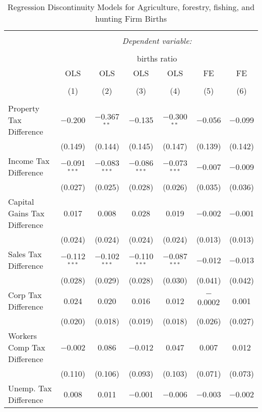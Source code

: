 
\begin{table}[!htbp] \centering 
  \caption{Regression Discontinuity Models for  Agriculture, forestry, fishing, and hunting Firm Births} 
  \label{11rd} 
\footnotesize 
\begin{tabular}{@{\extracolsep{5pt}}lcccccc} 
\\[-1.8ex]\hline 
\hline \\[-1.8ex] 
 & \multicolumn{6}{c}{\textit{Dependent variable:}} \\ 
\cline{2-7} 
\\[-1.8ex] & \multicolumn{6}{c}{births ratio} \\ 
 & OLS & OLS & OLS & OLS & FE & FE \\ 
\\[-1.8ex] & (1) & (2) & (3) & (4) & (5) & (6)\\ 
\hline \\[-1.8ex] 
 Property Tax Difference & $-$0.200 & $-$0.367$^{**}$ & $-$0.135 & $-$0.300$^{**}$ & $-$0.056 & $-$0.099 \\ 
  & (0.149) & (0.144) & (0.145) & (0.147) & (0.139) & (0.142) \\ 
  Income Tax Difference & $-$0.091$^{***}$ & $-$0.083$^{***}$ & $-$0.086$^{***}$ & $-$0.073$^{***}$ & $-$0.007 & $-$0.009 \\ 
  & (0.027) & (0.025) & (0.028) & (0.026) & (0.035) & (0.036) \\ 
  Capital Gains Tax Difference & 0.017 & 0.008 & 0.028 & 0.019 & $-$0.002 & $-$0.001 \\ 
  & (0.024) & (0.024) & (0.024) & (0.024) & (0.013) & (0.013) \\ 
  Sales Tax Difference & $-$0.112$^{***}$ & $-$0.102$^{***}$ & $-$0.110$^{***}$ & $-$0.087$^{***}$ & $-$0.012 & $-$0.013 \\ 
  & (0.028) & (0.029) & (0.028) & (0.030) & (0.041) & (0.042) \\ 
  Corp Tax Difference & 0.024 & 0.020 & 0.016 & 0.012 & $-$0.0002 & 0.001 \\ 
  & (0.020) & (0.018) & (0.019) & (0.018) & (0.026) & (0.027) \\ 
  Workers Comp Tax Difference & $-$0.002 & 0.086 & $-$0.012 & 0.047 & 0.007 & 0.012 \\ 
  & (0.110) & (0.106) & (0.093) & (0.103) & (0.071) & (0.073) \\ 
  Unemp. Tax Difference & 0.008 & 0.011 & $-$0.001 & $-$0.006 & $-$0.003 & $-$0.002 \\ 

\end{tabular}
\end{table}
